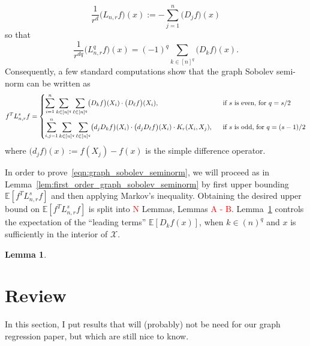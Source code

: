 \documentclass{article}
\newcommand{\1}{\mathbf{1}}
\newcommand{\Lap}{L}
\newcommand{\Xset}{\mathcal{X}}
\newcommand{\Ebb}{\mathbb{E}}
\theoremstyle{alden}
\theoremstyle{aldenthm}
\newtheorem{lemma}{Lemma}
\theoremstyle{definition}
\theoremstyle{remark}
\begin{document}
\begin{equation*}
\frac{1}{r^d}\bigl(\Lap_{n,r}f\bigr)(x) := -\sum_{j = 1}^{n} \bigl(D_jf\bigr)(x)
\end{equation*}
so that
\begin{equation}
\label{eqn:graph_Laplacian_out_of_sample}
\frac{1}{r^{dq}}\bigl(\Lap_{n,r}^qf\bigr)(x) = (-1)^q \sum_{k \in [n]^q} \bigl(D_kf\bigr)(x).
\end{equation} 
Consequently, a few standard computations show that the graph Sobolev semi-norm can be written as 
\begin{equation*}
f^T \Lap_{n,r}^s f = 
\begin{dcases}
\sum_{i = 1}^{n} \sum_{k \in [n]^q} \sum_{\ell \in [n]^q} \bigl(D_kf\bigr)(X_i) \cdot \bigl(D_\ell f\bigr)(X_i),~~ & \textrm{if $s$ is even, for $q = s/2$} \\
\sum_{i,j = 1}^{n} \sum_{k \in [n]^q} \sum_{\ell \in [n]^q} \bigl(d_jD_kf\bigr)(X_i) \cdot \bigl(d_jD_{\ell}f\bigr)(X_i) \cdot K_r(X_i,X_j),~~ & \textrm{if $s$ is odd, for $q = (s - 1)/2$}
\end{dcases}
\end{equation*}
where $\bigl(d_jf\bigr)(x) := f(X_j) - f(x)$ is the simple difference operator. 

In order to prove~\eqref{eqn:graph_sobolev_seminorm}, we will proceed as in Lemma~\ref{lem:first_order_graph_sobolev_seminorm} by first upper bounding $\Ebb[f^T \Lap_{n,r}^s f]$ and then applying Markov's inequality. Obtaining the desired upper bound on $\Ebb[f^T \Lap_{n,r}^s f]$ is split into \textcolor{red}{N} Lemmas, Lemmas \textcolor{red}{A - B}. Lemma~\ref{lem:expected_difference_operator} controls the expectation of the ``leading terms'' $\Ebb[D_kf(x)]$, when $k \in (n)^q$ and $x$ is sufficiently in the interior of $\Xset$. 
\begin{lemma}
	\label{lem:expected_difference_operator}
\end{lemma}

\section{Review}
In this section, I put results that will (probably) not be need for our graph regression paper, but which are still nice to know.
\end{document}
